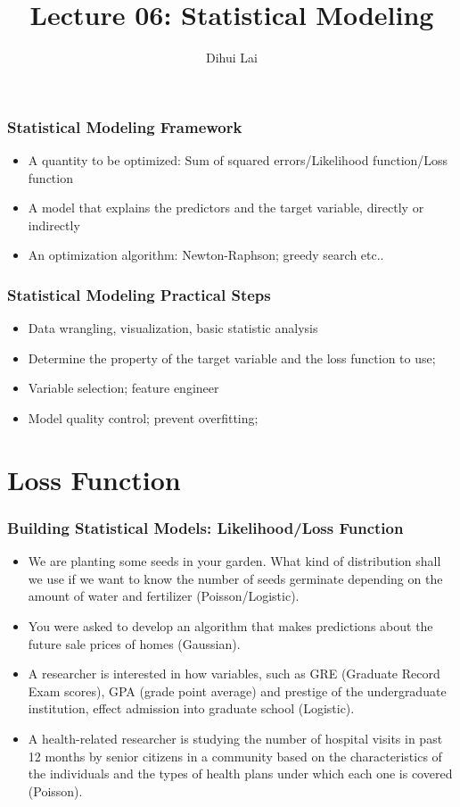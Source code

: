 \documentclass[notheorems, aspectratio=54, tikz,border=10pt,multi]{beamer}
\title{Lecture 06: Statistical Modeling}
\author{Dihui Lai}
\institute[WUSTL]{dlai@wustl.edu}
\begin{document}
\begin{frame}
    \titlepage
\end{frame}



\begin{frame}
\frametitle{Statistical Modeling Framework}
\begin{itemize}
\item A quantity to be optimized: Sum of squared errors/Likelihood function/Loss function
\item A model that explains the predictors and the target variable, directly or indirectly
\item An optimization algorithm: Newton-Raphson; greedy search etc..
\end{itemize}
\end{frame}

\begin{frame}
\frametitle{Statistical Modeling Practical Steps}
\begin{itemize}
\item Data wrangling, visualization, basic statistic analysis
\item Determine the property of the target variable and the loss function to use;
\item Variable selection; feature engineer
\item Model quality control; prevent overfitting; 
\end{itemize}
\end{frame}


\section{Loss Function}

\begin{frame}
\frametitle{Building Statistical Models: Likelihood/Loss Function}
\begin{itemize}
\item We are planting some seeds in your garden. What kind of distribution shall we use if we want to know the number of seeds germinate depending on the amount of water and fertilizer (Poisson/Logistic).
\item You were asked to develop an algorithm that makes predictions about the future sale prices of homes (Gaussian).
\item A researcher is interested in how variables, such as GRE (Graduate Record Exam scores), GPA (grade point average) and prestige of the undergraduate institution, effect admission into graduate school (Logistic).
\item A health-related researcher is studying the number of hospital visits in past 12 months by senior citizens in a community based on the characteristics of the individuals and the types of health plans under which each one is covered (Poisson).
\end{itemize}

\end{frame}
\end{document}
